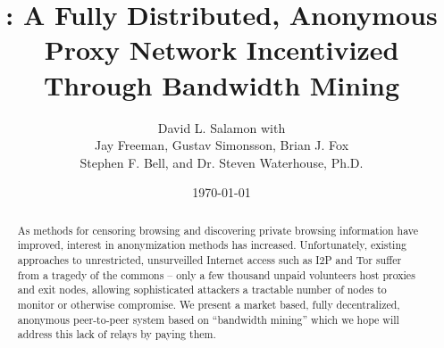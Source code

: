 \documentclass{article}
\title{\Orchid: A Fully Distributed, Anonymous Proxy Network Incentivized Through Bandwidth Mining}
\author{{David L. Salamon with} \\ {Jay Freeman, Gustav Simonsson, Brian J. Fox} \\ {{Stephen F. Bell, and Dr. Steven Waterhouse, Ph.D.}}}
\date{\today{}}
\begin{document}
\maketitle

\begin{abstract}

  As methods for censoring browsing and discovering private browsing information have improved, interest in anonymization methods has increased. Unfortunately, existing approaches to unrestricted, unsurveilled Internet access such
as I2P and Tor suffer from a tragedy of the commons – only a few thousand unpaid volunteers host proxies and exit nodes, allowing sophisticated attackers a tractable number of nodes to monitor or otherwise compromise. We present a market based, fully decentralized, anonymous peer-to-peer system based on “bandwidth mining” which we hope will address this lack of relays by paying them.






\end{abstract}
\end{document}
